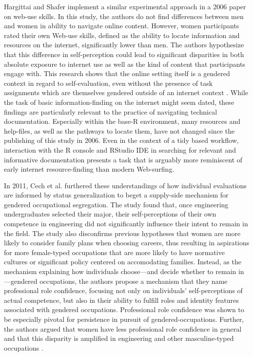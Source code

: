 Hargittai and Shafer implement a similar experimental approach in a 2006 paper on web-use skills. In this study, the authors do not find differences between men and women in ability to navigate online content. However, women participants rated their own Web-use skills, defined as the ability to locate information and resources on the internet, significantly lower than men. The authors hypothesize that this difference in self-perception could lead to significant disparities in both absolute exposure to internet use as well as the kind of content that participants engage with. This research shows that the online setting itself is a gendered context in regard to self-evaluation, even without the presence of task assignments which are themselves gendered outside of an internet context \cite{hargittai_differences_2006}. While the task of basic information-finding on the internet might seem dated, these findings are particularly relevant to the practice of navigating technical documentation. Especially within the base-R environment, many resources and help-files, as well as the pathways to locate them, have not changed since the publishing of this study in 2006. Even in the context of a tidy based workflow, interaction with the R console and RStudio IDE in searching for relevant and informative documentation presents a task that is arguably more reminiscent of early internet resource-finding than modern Web-surfing.  

In 2011, Cech et al. furthered these understandings of how individual evaluations are informed by status generalization to beget a supply-side mechanism for gendered occupational segregation. The study found that, once engineering undergraduates selected their major, their self-perceptions of their own competence in engineering did not significantly influence their intent to remain in the field. The study also disconfirms previous hypotheses that women are more likely to consider family plans when choosing careers, thus resulting in aspirations for more female-typed occupations that are more likely to have normative cultures or significant policy centered on accomodating families. Instead, as the mechanism explaining how individuals choose—and decide whether to remain in—gendered occupations, the authors propose a mechanism that they name professional role confidence, focusing not only on individuals’ self-perceptions of actual competence, but also in their ability to fulfill roles and identity features associated with gendered occupations. Professional role confidence was shown to be especially pivotal for persistence in pursuit of gendered-occupations. Further, the authors argued that women have less professional role confidence in general and that this disparity is amplified in engineering and other masculine-typed occupations \cite{cech_professional_2011}.  

